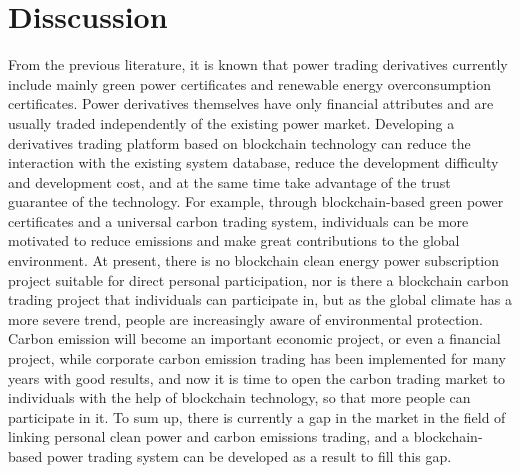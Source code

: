 \section{Disscussion}
From the previous literature, it is known that power trading derivatives currently include mainly green power certificates and renewable energy overconsumption certificates. Power derivatives themselves have only financial attributes and are usually traded independently of the existing power market. Developing a derivatives trading platform based on blockchain technology can reduce the interaction with the existing system database, reduce the development difficulty and development cost, and at the same time take advantage of the trust guarantee of the technology. For example, through blockchain-based green power certificates and a universal carbon trading system, individuals can be more motivated to reduce emissions and make great contributions to the global environment. At present, there is no blockchain clean energy power subscription project suitable for direct personal participation, nor is there a blockchain carbon trading project that individuals can participate in, but as the global climate has a more severe trend, people are increasingly aware of environmental protection. Carbon emission will become an important economic project, or even a financial project, while corporate carbon emission trading has been implemented for many years with good results, and now it is time to open the carbon trading market to individuals with the help of blockchain technology, so that more people can participate in it. To sum up, there is currently a gap in the market in the field of linking personal clean power and carbon emissions trading, and a blockchain-based power trading system can be developed as a result to fill this gap.
